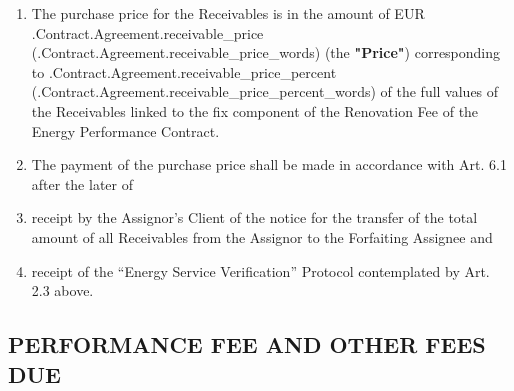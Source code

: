 \documentclass[a4paper]{article}
\begin{document}
\begin{enumerate}
\item{The purchase price for the Receivables is in the amount of EUR
    \iffalse input forfaitingFields.receivable_price value="{{.Contract.Agreement.receivable_price}}" type="number" \fi {{.Contract.Agreement.receivable_price}} (\iffalse input forfaitingFields.receivable_price_words value="{{.Contract.Agreement.receivable_price_words}}" \fi {{.Contract.Agreement.receivable_price_words}}) (the \textbf{"Price"}) corresponding to
    \iffalse input forfaitingFields.receivable_price_percent value="{{.Contract.Agreement.receivable_price_percent}}" type="number" \fi {{.Contract.Agreement.receivable_price_percent}} (\iffalse input forfaitingFields.receivable_price_percent_words value="{{.Contract.Agreement.receivable_price_percent_words}}" \fi {{.Contract.Agreement.receivable_price_percent_words}}) of the full values of the Receivables
    linked to the fix component of the Renovation Fee of the Energy
    Performance Contract.}

\item{The payment of the purchase price shall be made in accordance
    with Art. 6.1 after the later of}

\item{receipt by the Assignor’s Client of the notice for the transfer
    of the total amount of all Receivables from the Assignor to the
    Forfaiting Assignee and }

\item{receipt of the “Energy Service Verification” Protocol contemplated by
    Art. 2.3 above.}
\end{enumerate}

\subsection{PERFORMANCE FEE AND OTHER FEES DUE}
\end{document}
